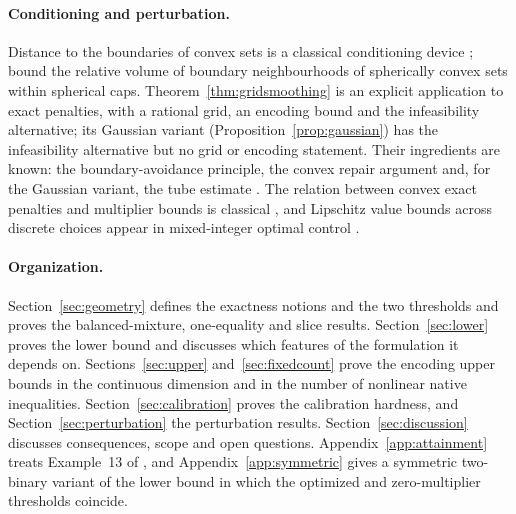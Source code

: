 \paragraph{Conditioning and perturbation.}
Distance to the boundaries of convex sets is a classical conditioning
device \citep{DunaganSpielmanTeng2011};
\citet[Theorem~3.3 and Corollary~3.4]{BuergisserAmelunxen2012} bound
the relative volume of boundary neighbourhoods of spherically convex
sets within spherical caps.
Theorem~\ref{thm:gridsmoothing} is an explicit application to exact
penalties, with a rational grid, an encoding bound and the infeasibility
alternative; its Gaussian variant (Proposition~\ref{prop:gaussian}) has
the infeasibility alternative but no grid or encoding statement. Their ingredients are known: the boundary-avoidance
principle, the convex repair argument and, for the Gaussian variant, the
tube estimate \citep[Lemma~2.3.4]{DunaganSpielmanTeng2011}. The relation between convex exact
penalties and multiplier bounds is classical
\citep[Theorem~4.2]{FriedlanderTseng2007}, and Lipschitz value bounds
across discrete choices appear in mixed-integer optimal control
\citep[Theorem~3]{GugatHante2017}.

\paragraph{Organization.}
Section~\ref{sec:geometry} defines the exactness notions and the two
thresholds and proves the balanced-mixture, one-equality and slice
results. Section~\ref{sec:lower} proves the lower bound and discusses
which features of the formulation it depends on.
Sections~\ref{sec:upper} and~\ref{sec:fixedcount} prove the encoding
upper bounds in the continuous dimension and in the number of nonlinear
native inequalities. Section~\ref{sec:calibration} proves the
calibration hardness, and Section~\ref{sec:perturbation} the perturbation
results. Section~\ref{sec:discussion} discusses consequences, scope and
open questions. Appendix~\ref{app:attainment} treats Example~13 of
\citet{LefebvreSchmidt2025}, and Appendix~\ref{app:symmetric} gives a
symmetric two-binary variant of the lower bound in which the optimized
and zero-multiplier thresholds coincide.

